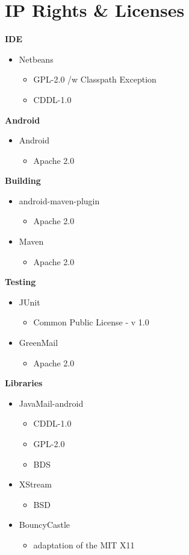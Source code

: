 \section{IP Rights \& Licenses}
	{\bf IDE}
		\begin{itemize}
			\item Netbeans
				\begin{itemize}
					\item GPL-2.0 /w Classpath Exception
					\item CDDL-1.0
				\end{itemize}
		\end{itemize}
	{\bf Android}
		\begin{itemize}
			\item Android
				\begin{itemize}
					\item Apache 2.0
				\end{itemize}
		\end{itemize}
	{\bf Building}
		\begin{itemize}
			\item android-maven-plugin
				\begin{itemize}
					\item Apache 2.0
				\end{itemize}
			\item Maven
				\begin{itemize}
					\item Apache 2.0
				\end{itemize}
		\end{itemize}
	{\bf Testing}
		\begin{itemize}
			\item JUnit
				\begin{itemize}
					\item Common Public License - v 1.0
				\end{itemize}
			\item GreenMail
				\begin{itemize}
					\item Apache 2.0
				\end{itemize}
		\end{itemize}
	{\bf Libraries}
		\begin{itemize}
			\item JavaMail-android
				\begin{itemize}
					\item CDDL-1.0
					\item GPL-2.0
					\item BDS
				\end{itemize}
			\item XStream
				\begin{itemize}
					\item BSD
				\end{itemize}
			\item BouncyCastle
				\begin{itemize}
					\item adaptation of the MIT X11
				\end{itemize}
		\end{itemize}
